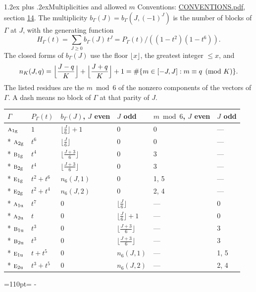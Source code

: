 \documentclass[10pt,a4paper]{article}
\makeatletter
\renewcommand\section{\@startsection{section}{1}{\z@}{-3ex plus -1ex minus -.2ex}%
  {1.2ex plus .2ex}{\normalfont\large\sffamily\bfseries\color{parttitle}}}
\newcommand{\needspace}[1]{\par\penalty-100\begingroup\dimen0=#1\relax\dimen2=\pagegoal
  \advance\dimen2-\pagetotal\ifdim\dimen0>\dimen2\relax\ifdim\dimen2>0pt\vfil\break\fi\fi
  \endgroup}
\numberwithin{equation}{section}
\newcommand{\irr}[1]{\text{\normalfont\scshape #1}}
\newcommand{\ptag}[1]{\mathrm{#1}}
\makeatother
\begin{document}
\section{Multiplicities and allowed \texorpdfstring{$m$}{m}}\label{s:multiplicities}
Conventions: \href{../../CONVENTIONS.pdf}{CONVENTIONS.pdf}, section \href{../../CONVENTIONS.pdf\#conv.14}{14}.
\leavevmode\label{n:function.generating}\label{n:index.generating.variable}\label{n:function.generating.numerator}The multiplicity $b_\Gamma(J) = b_\Gamma(J, (-1)^J)$ is the number of blocks of $\Gamma$ at $J$, with the generating function
\begin{equation}\label{e:gf}H_\Gamma(t) = \sum_{J\ge0} b_\Gamma(J)\,t^J = P_\Gamma(t)/((1-t^{2})(1-t^{6})).\end{equation}
\leavevmode\label{n:delimiter.floor}\label{n:local.floor.x}\label{n:function.count}\label{n:index.modulus.K}\label{n:index.residue}The closed forms of $b_\Gamma(J)$ use the floor $\lfloor x\rfloor$, the greatest integer $\le x$, and
\begin{equation}\label{e:count}n_K(J,q) = \Bigl\lfloor\frac{J-q}{K}\Bigr\rfloor + \Bigl\lfloor\frac{J+q}{K}\Bigr\rfloor + 1 = \#\{m\in[-J,J] : m\equiv q \pmod{K}\}.\end{equation}
\leavevmode\label{n:head.parity}The listed residues are the $m \bmod 6$ of the nonzero components of the vectors of $\Gamma$. A dash means no block of $\Gamma$ at that parity of $J$.
{\small{\renewcommand{\arraystretch}{1.3}\begin{longtable}{@{}llllll@{}}\toprule
$\Gamma$ & $P_\Gamma(t)$ & $b_\Gamma(J)$, $J$ even & $J$ odd & $m \bmod 6$, $J$ even & $J$ odd\\\midrule\endhead
\bottomrule\endfoot\endlastfoot
$\irr{a}_{1\ptag{g}}$ & $1$ & $\bigl\lfloor\tfrac{J}{6}\bigr\rfloor + 1$ & $0$ & 0 & ---\\*
$\irr{a}_{2\ptag{g}}$ & $t^{6}$ & $\bigl\lfloor\tfrac{J}{6}\bigr\rfloor$ & $0$ & 0 & ---\\*
$\irr{b}_{1\ptag{g}}$ & $t^{4}$ & $\bigl\lfloor\tfrac{J+3}{6}\bigr\rfloor$ & $0$ & 3 & ---\\*
$\irr{b}_{2\ptag{g}}$ & $t^{4}$ & $\bigl\lfloor\tfrac{J+3}{6}\bigr\rfloor$ & $0$ & 3 & ---\\*
$\irr{e}_{1\ptag{g}}$ & $t^{2} + t^{6}$ & $n_{6}(J,1)$ & $0$ & 1, 5 & ---\\*
$\irr{e}_{2\ptag{g}}$ & $t^{2} + t^{4}$ & $n_{6}(J,2)$ & $0$ & 2, 4 & ---\\*
$\irr{a}_{1\ptag{u}}$ & $t^{7}$ & $0$ & $\bigl\lfloor\tfrac{J}{6}\bigr\rfloor$ & --- & 0\\*
$\irr{a}_{2\ptag{u}}$ & $t$ & $0$ & $\bigl\lfloor\tfrac{J}{6}\bigr\rfloor + 1$ & --- & 0\\*
$\irr{b}_{1\ptag{u}}$ & $t^{3}$ & $0$ & $\bigl\lfloor\tfrac{J+3}{6}\bigr\rfloor$ & --- & 3\\*
$\irr{b}_{2\ptag{u}}$ & $t^{3}$ & $0$ & $\bigl\lfloor\tfrac{J+3}{6}\bigr\rfloor$ & --- & 3\\*
$\irr{e}_{1\ptag{u}}$ & $t + t^{5}$ & $0$ & $n_{6}(J,1)$ & --- & 1, 5\\*
$\irr{e}_{2\ptag{u}}$ & $t^{3} + t^{5}$ & $0$ & $n_{6}(J,2)$ & --- & 2, 4\\
\bottomrule\end{longtable}}}
\needspace{110pt}
\end{document}

